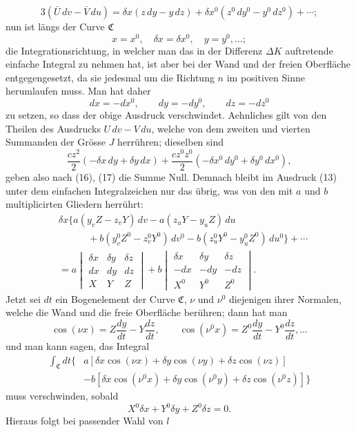 \documentclass[11pt,a4paper,leqno]{article}
\begin{document}
\[
3(\bar U\,dv-\bar V\,du)
=\delta x(z\,dy-y\,dz)
+\delta x^0(z^0\,dy^0-y^0\,dz^0)+\cdots;
\]
nun ist längs der Curve $\mathfrak{C}$
\begin{equation}\tag{16}
x=x^0,\quad \delta x=\delta x^0,\quad y=y^0,\ldots;
\end{equation}
die Integrationsrichtung, in welcher man das in der Differenz $\Delta K$
auftretende einfache Integral zu nehmen hat, ist aber bei der Wand und der
freien Oberfläche entgegengesetzt, da sie jedesmal um die Richtung $n$ im
positiven Sinne herumlaufen muss. Man hat daher
\begin{equation}\tag{17}
dx=-dx^0,\qquad dy=-dy^0,\qquad dz=-dz^0
\end{equation}
zu setzen, so dass der obige Ausdruck verschwindet. Aehnliches gilt von den
Theilen des Ausdrucks $U\,dv-V\,du$, welche von dem zweiten und vierten
Summanden der Grösse $J$ herrühren; dieselben sind
\[
\frac{cz^2}{2}(-\delta x\,dy+\delta y\,dx)
+\frac{cz^0z^0}{2}(-\delta x^0\,dy^0+\delta y^0\,dx^0),
\]
geben also nach (16), (17) die Summe Null. Demnach bleibt im Ausdruck (13)
unter dem einfachen Integralzeichen nur das übrig, was von den mit $a$ und $b$
multiplicirten Gliedern herrührt:
\[
\begin{aligned}
&\delta x\{a(y_vZ-z_vY)\,dv-a(z_uY-y_uZ)\,du\\
&\qquad\quad+b(y_v^0Z^0-z_v^0Y^0)\,dv^0
-b(z_u^0Y^0-y_u^0Z^0)\,du^0\}+\cdots\\
&=a\begin{vmatrix}
\delta x&\delta y&\delta z\\
dx&dy&dz\\
X&Y&Z
\end{vmatrix}
+b\begin{vmatrix}
\delta x&\delta y&\delta z\\
-dx&-dy&-dz\\
X^0&Y^0&Z^0
\end{vmatrix}.
\end{aligned}
\]
Jetzt sei $dt$ ein Bogenelement der Curve $\mathfrak{C}$, $\nu$ und $\nu^0$
diejenigen ihrer Normalen, welche die Wand und die freie Oberfläche berühren;
dann hat man
\[
\cos(\nu x)=Z\frac{dy}{dt}-Y\frac{dz}{dt},\qquad
\cos(\nu^0x)=Z^0\frac{dy}{dt}-Y^0\frac{dz}{dt},\ldots
\]
und man kann sagen, das Integral
\[
\begin{aligned}
\int_{\mathfrak{C}}dt\{&a[\delta x\cos(\nu x)+\delta y\cos(\nu y)
+\delta z\cos(\nu z)]\\
&-b[\delta x\cos(\nu^0x)+\delta y\cos(\nu^0y)
+\delta z\cos(\nu^0z)]\}
\end{aligned}
\]
muss verschwinden, sobald
\[
X^0\delta x+Y^0\delta y+Z^0\delta z=0.
\]
Hieraus folgt bei passender Wahl von $l$
\end{document}
